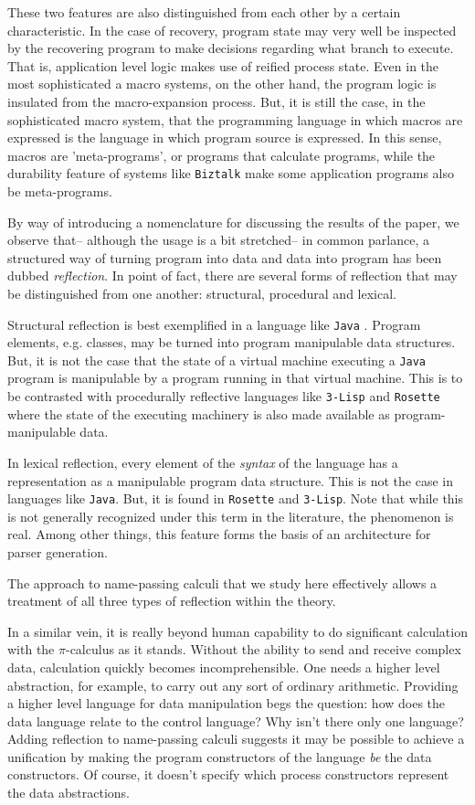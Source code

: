 \documentclass[]{amsart}
\theoremstyle{definition}
\theoremstyle{remark}
\numberwithin{equation}{subsection}
\newcommand{\pic}{$\pi$-calculus}
\begin{document}
These two features are also distinguished from each other by a certain
characteristic. In the case of recovery, program state may very well
be inspected by the recovering program to make decisions regarding
what branch to execute. That is, application level logic makes use of
reified process state. Even in the most sophisticated a macro systems,
on the other hand, the program logic is insulated from the
macro-expansion process. But, it is still the case, in the
sophisticated macro system, that the programming language in which
macros are expressed is the language in which program source is
expressed. In this sense, macros are 'meta-programs', or programs that
calculate programs, while the durability feature of systems like
\texttt{Biztalk} make some application programs also be meta-programs.
 
By way of introducing a nomenclature for discussing the results of the
paper, we observe that-- although the usage is a bit stretched-- in
common parlance, a structured way of turning program into data and
data into program has been dubbed \textit{reflection}. In point of
fact, there are several forms of reflection that may be distinguished
from one another: structural, procedural and lexical.

Structural reflection is best exemplified in a language like
\texttt{Java} \cite{JavaReflection}. Program elements, e.g. classes,
may be turned into program manipulable data structures. But, it is not
the case that the state of a virtual machine executing a \texttt{Java}
program is manipulable by a program running in that virtual
machine. This is to be contrasted with procedurally reflective
languages like \texttt{3-Lisp} \cite{lisp3} and \texttt{Rosette}
\cite{rosette} where the state of the executing machinery is also made
available as program-manipulable data.

In lexical reflection, every element of the \textit{syntax} of the
language has a representation as a manipulable program data
structure. This is not the case in languages like \texttt{Java}. But,
it is found in \texttt{Rosette} and \texttt{3-Lisp}. Note that while
this is not generally recognized under this term in the literature,
the phenomenon is real. Among other things, this feature forms the
basis of an architecture for parser generation.

The approach to name-passing calculi that we study here effectively
allows a treatment of all three types of reflection within the theory.

In a similar vein, it is really beyond human capability to do
significant calculation with the {\pic} as it stands. Without the
ability to send and receive complex data, calculation quickly becomes
incomprehensible. One needs a higher level abstraction, for example,
to carry out any sort of ordinary arithmetic. Providing a higher level
language for data manipulation begs the question: how does the data
language relate to the control language? Why isn't there only one
language? Adding reflection to name-passing calculi suggests it may be
possible to achieve a unification by making the program constructors
of the language \textit{be} the data constructors. Of course, it
doesn't specify which process constructors represent the data
abstractions.
\end{document}
